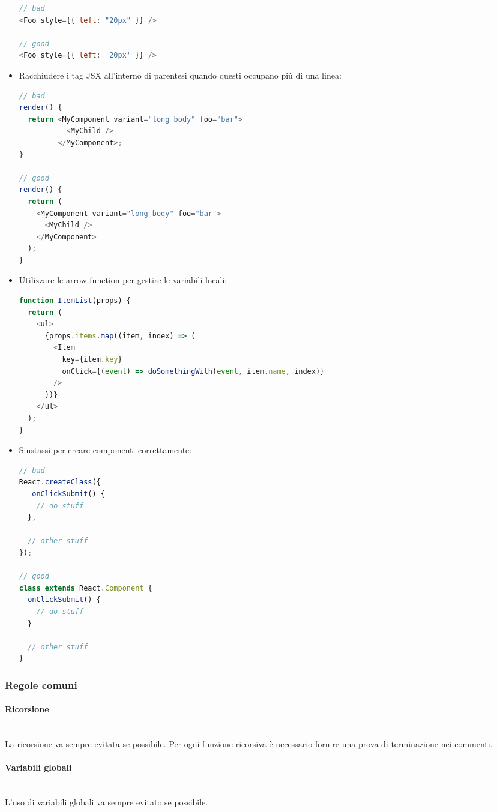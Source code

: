 \begin{itemize}
\begin{lstlisting}[frame=single, language=JavaScript]
// bad
<Foo style={{ left: "20px" }} />

// good
<Foo style={{ left: '20px' }} />
	\end{lstlisting}
	\item Racchiudere i tag JSX all'interno di parentesi quando questi occupano più di una linea:
			\begin{lstlisting}[frame=single, language=JavaScript]
// bad
render() {
  return <MyComponent variant="long body" foo="bar">
           <MyChild />
         </MyComponent>;
}

// good
render() {
  return (
    <MyComponent variant="long body" foo="bar">
      <MyChild />
    </MyComponent>
  );
}

	\end{lstlisting}
	\item Utilizzare le arrow-function per gestire le variabili locali:
		\begin{lstlisting}[frame=single, language=JavaScript]
function ItemList(props) {
  return (
    <ul>
      {props.items.map((item, index) => (
        <Item
          key={item.key}
          onClick={(event) => doSomethingWith(event, item.name, index)}
        />
      ))}
    </ul>
  );
}
		\end{lstlisting}
		\item Sinstassi per creare componenti correttamente:
		\begin{lstlisting}[frame=single, language=JavaScript]
// bad
React.createClass({
  _onClickSubmit() {
    // do stuff
  },

  // other stuff
});

// good
class extends React.Component {
  onClickSubmit() {
    // do stuff
  }

  // other stuff
}
	\end{lstlisting}
\end{itemize}


\subsubsection{Regole comuni}
\paragraph{Ricorsione}\mbox{}\\
La ricorsione va sempre evitata se possibile. Per ogni funzione ricorsiva è necessario fornire
una prova di terminazione nei commenti.

\paragraph{Variabili globali}\mbox{}\\
L'uso di variabili globali va sempre evitato se possibile.

